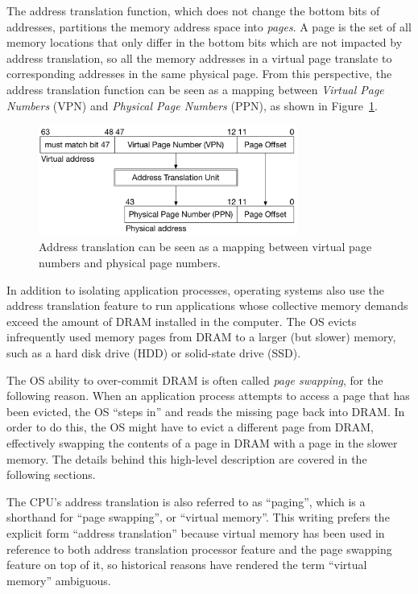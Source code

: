 The address translation function, which does not change the bottom bits of
addresses, partitions the memory address space into \textit{pages}. A page is
the set of all memory locations that only differ in the bottom bits which are
not impacted by address translation, so all the memory addresses in a virtual
page translate to corresponding addresses in the same physical page. From this
perspective, the address translation function can be seen as a mapping between
\textit{Virtual Page Numbers} (VPN) and \textit{Physical Page Numbers} (PPN),
as shown in Figure~\ref{fig:address_translation_bits}.

\begin{figure}[hbt]
  \centering
  \includegraphics[width=85mm]{figures/address_translation_bits.pdf}
  \caption{
    Address translation can be seen as a mapping between virtual page numbers
    and physical page numbers.
  }
  \label{fig:address_translation_bits}
\end{figure}

In addition to isolating application processes, operating systems also use the
address translation feature to run applications whose collective memory
demands exceed the amount of DRAM installed in the computer. The OS evicts
infrequently used memory pages from DRAM to a larger (but slower) memory, such
as a hard disk drive (HDD) or solid-state drive (SSD).

The OS ability to over-commit DRAM is often called \textit{page swapping}, for
the following reason. When an application process attempts to access a page
that has been evicted, the OS ``steps in'' and reads the missing page back into
DRAM. In order to do this, the OS might have to evict a different page from
DRAM, effectively swapping the contents of a page in DRAM with a page in the
slower memory. The details behind this high-level description are covered in
the following sections.

The CPU's address translation is also referred to as ``paging'', which is a
shorthand for ``page swapping'', or ``virtual memory''. This writing prefers
the explicit form ``address translation'' because virtual memory has been used
in reference to both address translation processor feature and the page
swapping feature on top of it, so historical reasons have rendered the term
``virtual memory'' ambiguous.


